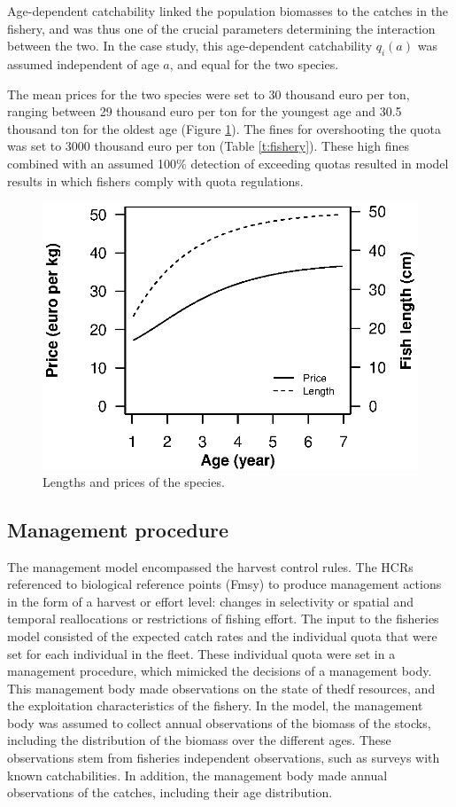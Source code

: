 \documentclass[12pt,oneline,a4paper,numbib]{ouparticle}
\numberwithin{equation}{subsection} %
\begin{document}
Age-dependent catchability linked the population biomasses to the catches in the fishery, and was thus one of the crucial parameters determining the interaction between the two. In the case study, this age-dependent catchability $q_i (a)$ was assumed independent of age $a$, and equal for the two species.

The mean prices for the two species were set to 30 thousand euro per ton, ranging between 29 thousand euro per ton for the youngest age and 30.5 thousand ton for the oldest age (Figure \ref{f:prices}). The fines for overshooting the quota was set  to 3000 thousand euro per ton (Table \ref{t:fishery}). These high fines combined with an assumed 100\% detection of exceeding quotas resulted in model results in which fishers comply with quota regulations.

\begin{figure}[!ht]
\centering
\includegraphics[width=.5\textwidth]{Figures/Prices.eps} 
\caption{Lengths and prices of the species.}
\label{f:prices}
\end{figure}

\subsection{Management procedure}

The management model encompassed the harvest control rules. The HCRs referenced to biological reference points (Fmsy) to produce management actions in the form of a harvest or effort level: changes in selectivity or spatial and temporal reallocations or restrictions of fishing effort. The input to the fisheries model consisted of the expected catch rates and the individual quota that were set for each individual in the fleet. These individual quota were set in a management procedure, which mimicked the decisions of a management body. This management body made observations on the state of thedf resources, and the exploitation characteristics of the fishery. In the model, the management body was assumed to collect annual observations of the biomass of the stocks, including the distribution of the biomass over the different ages. These observations stem from fisheries independent observations, such as surveys with known catchabilities. In addition, the management body made annual observations of the catches, including their age distribution. 
\end{document}
